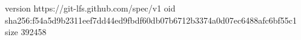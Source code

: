 version https://git-lfs.github.com/spec/v1
oid sha256:f54a5d9b2311eef7dd44ed9fbdf60db07b6712b3374a0d07ec6488afc6bf55c1
size 392458
